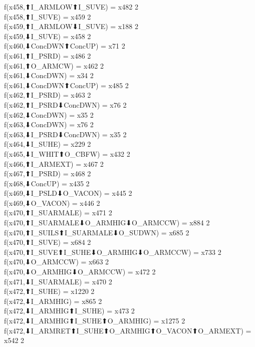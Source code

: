 f(x458,⬆I_ARMLOW⬆I_SUVE) = x482 {2} \\
f(x458,⬆I_SUVE) = x459 {2} \\
f(x459,⬆I_ARMLOW⬇I_SUVE) = x188 {2} \\
f(x459,⬇I_SUVE) = x458 {2} \\
f(x460,⬇ConcDWN⬆ConcUP) = x71 {2} \\
f(x461,⬆I_PSRD) = x486 {2} \\
f(x461,⬆O_ARMCW) = x462 {2} \\
f(x461,⬇ConcDWN) = x34 {2} \\
f(x461,⬇ConcDWN⬆ConcUP) = x485 {2} \\
f(x462,⬆I_PSRD) = x463 {2} \\
f(x462,⬆I_PSRD⬇ConcDWN) = x76 {2} \\
f(x462,⬇ConcDWN) = x35 {2} \\
f(x463,⬇ConcDWN) = x76 {2} \\
f(x463,⬇I_PSRD⬇ConcDWN) = x35 {2} \\
f(x464,⬇I_SUHE) = x229 {2} \\
f(x465,⬇I_WHIT⬆O_CBFW) = x432 {2} \\
f(x466,⬆I_ARMEXT) = x467 {2} \\
f(x467,⬆I_PSRD) = x468 {2} \\
f(x468,⬇ConcUP) = x435 {2} \\
f(x469,⬇I_PSLD⬇O_VACON) = x445 {2} \\
f(x469,⬇O_VACON) = x446 {2} \\
f(x470,⬆I_SUARMALE) = x471 {2} \\
f(x470,⬆I_SUARMALE⬇O_ARMHIG⬇O_ARMCCW) = x884 {2} \\
f(x470,⬆I_SUILS⬆I_SUARMALE⬇O_SUDWN) = x685 {2} \\
f(x470,⬆I_SUVE) = x684 {2} \\
f(x470,⬆I_SUVE⬆I_SUHE⬇O_ARMHIG⬇O_ARMCCW) = x733 {2} \\
f(x470,⬇O_ARMCCW) = x663 {2} \\
f(x470,⬇O_ARMHIG⬇O_ARMCCW) = x472 {2} \\
f(x471,⬇I_SUARMALE) = x470 {2} \\
f(x472,⬆I_SUHE) = x1220 {2} \\
f(x472,⬇I_ARMHIG) = x865 {2} \\
f(x472,⬇I_ARMHIG⬆I_SUHE) = x473 {2} \\
f(x472,⬇I_ARMHIG⬆I_SUHE⬆O_ARMHIG) = x1275 {2} \\
f(x472,⬇I_ARMRET⬆I_SUHE⬆O_ARMHIG⬆O_VACON⬆O_ARMEXT) = x542 {2} \\
